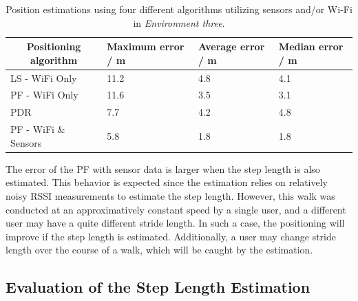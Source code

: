 \documentclass{LTHthesis}
\begin{document}
\begin{table}[!hbt]
\begin{center}
\begin{tabular}{|l|l|l|l|}
\hline
\multicolumn{1}{|c|}{Positioning algorithm} & Maximum error / m & Average error / m  & Median error / m \\
\hline
\hline
LS - WiFi Only & 11.2 & 4.8 & 4.1 \\
\hline
PF - WiFi Only & 11.6 & 3.5 & 3.1  \\
\hline
PDR & 7.7 & 4.2 & 4.8  \\
\hline
PF - WiFi \& Sensors & 5.8 & 1.8 & 1.8 \\
\hline
\end{tabular}
\end{center}
\caption{Position estimations using four different algorithms utilizing sensors and/or \newline Wi-Fi in \emph{Environment three}.}\label{table:error_different_algorithms}
\end{table}

The error of the PF with sensor data is larger when the step length is also estimated. This behavior is expected since the estimation relies on relatively noisy RSSI measurements to estimate the step length. However, this walk was conducted at an approximatively constant speed by a single user, and a different user may have a quite different stride length. In such a case, the positioning will improve if the  step length is estimated. Additionally, a user may change stride length over the course of a walk, which will be caught by the estimation.  
%

\subsection{Evaluation of the Step Length Estimation}
\end{document}
